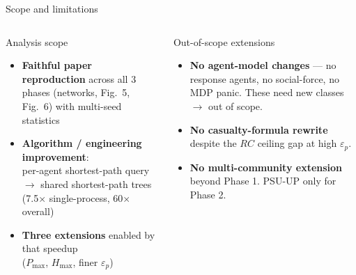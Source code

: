 \documentclass[aspectratio=169, xcolor=table]{beamer}
\begin{document}
\begin{frame}[t]{Scope and limitations}
\footnotesize

\begin{columns}[T,onlytextwidth]
\begin{block}{\small Analysis scope}
\scriptsize
\begin{itemize}\itemsep0.25em
  \item \textbf{Faithful paper reproduction} across all 3 phases (networks, Fig.\ 5, Fig.\ 6) with multi-seed statistics
  \item \textbf{Algorithm / engineering improvement}:\\
        per-agent shortest-path query $\to$ shared shortest-path trees (7.5$\times$ single-process, 60$\times$ overall)
  \item \textbf{Three extensions} enabled by that speedup\\
        ($P_{\max}$, $H_{\max}$, finer $\varepsilon_p$)
\end{itemize}
\end{block}

\begin{alertblock}{\small Out-of-scope extensions}
\scriptsize
\begin{itemize}\itemsep0.25em
  \item \textbf{No agent-model changes} --- no response agents, no social-force, no MDP panic. These need new classes $\to$ out of scope.
  \item \textbf{No casualty-formula rewrite} despite the $RC$ ceiling gap at high $\varepsilon_p$.
  \item \textbf{No multi-community extension} beyond Phase 1. PSU-UP only for Phase 2.
\end{itemize}
\end{alertblock}
\end{columns}

\vspace{0.8em}
\begin{center}
\end{center}
\end{frame}
\end{document}
